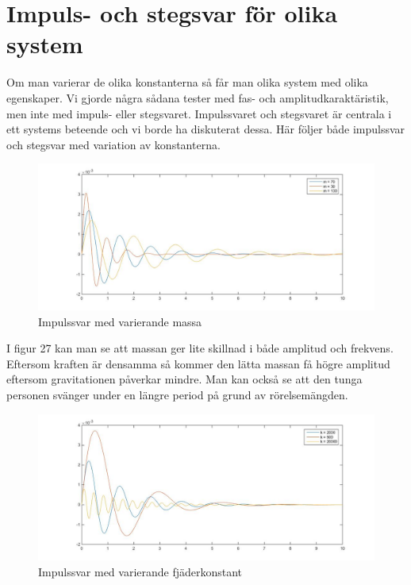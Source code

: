 \documentclass[10pt,a4paper]{article}
\begin{document}
\section{Impuls- och stegsvar för olika system}

Om man varierar de olika konstanterna så får man olika system med olika egenskaper. Vi gjorde några sådana tester med fas- och amplitudkaraktäristik, men inte med impuls- eller stegsvaret. Impulssvaret och stegsvaret är centrala i ett systems beteende och vi borde ha diskuterat dessa. Här följer både impulssvar och stegsvar med variation av konstanterna.

\begin{figure}[h]
\begin{center}
\includegraphics[scale=0.4]{impulssvar(massa)}
\caption{Impulssvar med varierande massa}
\end{center}
\end{figure}

I figur 27 kan man se att massan ger lite skillnad i både amplitud och frekvens. Eftersom kraften är densamma så kommer den lätta massan få högre amplitud eftersom gravitationen påverkar mindre. Man kan också se att den tunga personen svänger under en längre period på grund av rörelsemängden.

\newpage
\begin{figure}[h]
\begin{center}
\includegraphics[scale=0.4]{impulssvar(fjader)}
\caption{Impulssvar med varierande fjäderkonstant}
\end{center}
\end{figure}
\end{document}
